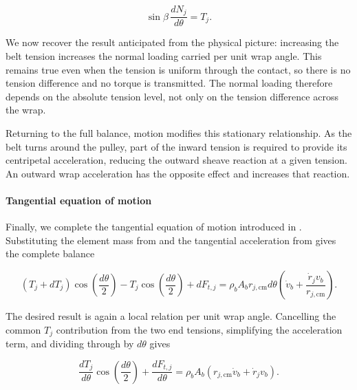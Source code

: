 \documentclass[11pt]{report}
\numberwithin{equation}{section}
\begin{document}
\begin{equation}
    \sin\beta\,
    \frac{dN_j}{d\theta}
    =
    T_j.
    \label{eq:wrap_static_radial_balance}
\end{equation}

We now recover the result anticipated from the physical picture: increasing
the belt tension increases the normal loading carried per unit wrap angle.
This remains true even when the tension is uniform through the contact, so
there is no tension difference and no torque is transmitted. The normal
loading therefore depends on the absolute tension level, not only on the
tension difference across the wrap.

Returning to the full balance, motion modifies this stationary relationship.
As the belt turns around the pulley, part of the inward tension is required to
provide its centripetal acceleration, reducing the outward sheave reaction at
a given tension. An outward wrap acceleration has the opposite effect and
increases that reaction.

\paragraph{Tangential equation of motion}

Finally, we complete the tangential equation of motion introduced in
. Substituting the element mass from
 and the tangential acceleration from
 gives the complete balance

\begin{equation}
    \left(T_j+dT_j\right)
    \cos\!\left(\frac{d\theta}{2}\right)
    -
    T_j\cos\!\left(\frac{d\theta}{2}\right)
    +
    dF_{t,j}
    =
    \rho_bA_b r_{j,\mathrm{cm}}d\theta
    \left(
        \dot v_b
        +
        \frac{\dot r_jv_b}{r_{j,\mathrm{cm}}}
    \right).
    \label{eq:wrap_tangential_balance_with_motion}
\end{equation}

The desired result is again a local relation per unit wrap angle. Cancelling
the common \(T_j\) contribution from the two end tensions, simplifying the
acceleration term, and dividing through by \(d\theta\) gives

\[
    \frac{dT_j}{d\theta}
    \cos\!\left(\frac{d\theta}{2}\right)
    +
    \frac{dF_{t,j}}{d\theta}
    =
    \rho_bA_b
    \left(
        r_{j,\mathrm{cm}}\dot v_b
        +
        \dot r_jv_b
    \right).
\]
\end{document}
